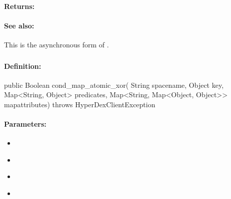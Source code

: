 \paragraph{Returns:}


\paragraph{See also:}  This is the asynchronous form of .

\pagebreak
\subsubsection{}
\label{api:java:cond_map_atomic_xor}


\paragraph{Definition:}
\begin{javacode}
public Boolean cond_map_atomic_xor(
        String spacename,
        Object key,
        Map<String, Object> predicates,
        Map<String, Map<Object, Object>> mapattributes) throws HyperDexClientException
\end{javacode}

\paragraph{Parameters:}
\begin{itemize}[noitemsep]
\item {}\\

\item {}\\

\item {}\\

\item {}\\

\end{itemize}

